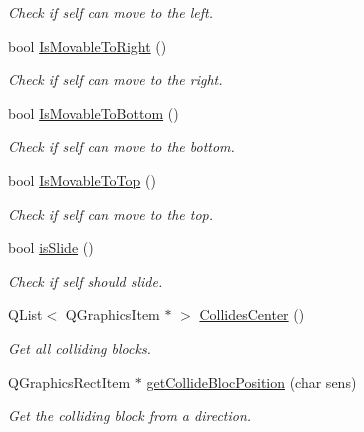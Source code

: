\begin{DoxyCompactItemize}
\begin{DoxyCompactList}\small\item\em Check if self can move to the left. \end{DoxyCompactList}\item 
bool \hyperlink{class_b___movable_a134b648413c6d27c008f8a0655ffa0f9}{Is\+Movable\+To\+Right} ()
\begin{DoxyCompactList}\small\item\em Check if self can move to the right. \end{DoxyCompactList}\item 
bool \hyperlink{class_b___movable_a190fdc076141ae6698334bfe4dfd61a3}{Is\+Movable\+To\+Bottom} ()
\begin{DoxyCompactList}\small\item\em Check if self can move to the bottom. \end{DoxyCompactList}\item 
bool \hyperlink{class_b___movable_a68bb6a98d031f9495cdeb80b9aa325c4}{Is\+Movable\+To\+Top} ()
\begin{DoxyCompactList}\small\item\em Check if self can move to the top. \end{DoxyCompactList}\item 
bool \hyperlink{class_b___movable_a44d1413ec8bceda3b1a50c673b429d03}{is\+Slide} ()
\begin{DoxyCompactList}\small\item\em Check if self should slide. \end{DoxyCompactList}\item 
Q\+List$<$ Q\+Graphics\+Item $\ast$ $>$ \hyperlink{class_b___movable_a081e4e71fb9483330f3315e6b32bbcbb}{Collides\+Center} ()
\begin{DoxyCompactList}\small\item\em Get all colliding blocks. \end{DoxyCompactList}\item 
Q\+Graphics\+Rect\+Item $\ast$ \hyperlink{class_b___movable_a4cb26e3d494505eaaa6773c0a448c479}{get\+Collide\+Bloc\+Position} (char sens)
\begin{DoxyCompactList}\small\item\em Get the colliding block from a direction. \end{DoxyCompactList}\end{DoxyCompactItemize}
